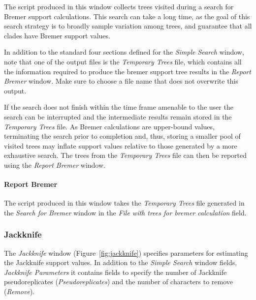 The script produced in this window collects trees visited during a search for Bremer support calculations. This
search can take a long time, as the goal of this search strategy is to broadly sample variation among trees, and guarantee that all
clades have Bremer support values. 

In addition to the standard four sections defined for the \emph{Simple Search} window,
note that one of the output files is the \emph{Temporary Trees} file, which 
contains all the information required to produce the bremer support tree
results in the \emph{Report Bremer} window. Make sure to choose a file name that does not overwrite this output.

If the search does not finish within the time frame amenable to the user the search can be interrupted and the intermediate results remain stored in the \emph{Temporary Trees} file.  As Bremer calculations are upper-bound values, terminating the search prior to completion and, thus, storing a smaller pool of visited trees may inflate support values relative to those generated by a more exhaustive search. The trees from the \emph{Temporary Trees} file can then be reported using the \emph{Report Bremer} window.

\paragraph{Report Bremer}
The script produced in this window takes the \emph{Temporary Trees} file generated in the \emph{Search for Bremer} window in the \emph{File with trees for bremer calculation} field. 

\subsubsection{Jackknife}

The \emph{Jackknife} window (Figure~\ref{fig:jackknife}) specifies parameters for estimating the
Jackknife support values. In addition to the \emph{Simple Search} window fields, \emph{Jackknife Parameters} it contains fields to specify
the number of Jackknife pseudoreplicates (\emph{Pseudoreplicates}) and the number of characters to remove (\emph{Remove}).

